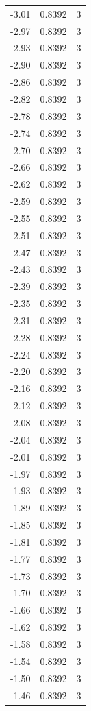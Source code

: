 \begin{longtable}{lrr}
  -3.01 & 0.8392 & 3 \\
  -2.97 & 0.8392 & 3 \\
  -2.93 & 0.8392 & 3 \\
  -2.90 & 0.8392 & 3 \\
  -2.86 & 0.8392 & 3 \\
  -2.82 & 0.8392 & 3 \\
  -2.78 & 0.8392 & 3 \\
  -2.74 & 0.8392 & 3 \\
  -2.70 & 0.8392 & 3 \\
  -2.66 & 0.8392 & 3 \\
  -2.62 & 0.8392 & 3 \\
  -2.59 & 0.8392 & 3 \\
  -2.55 & 0.8392 & 3 \\
  -2.51 & 0.8392 & 3 \\
  -2.47 & 0.8392 & 3 \\
  -2.43 & 0.8392 & 3 \\
  -2.39 & 0.8392 & 3 \\
  -2.35 & 0.8392 & 3 \\
  -2.31 & 0.8392 & 3 \\
  -2.28 & 0.8392 & 3 \\
  -2.24 & 0.8392 & 3 \\
  -2.20 & 0.8392 & 3 \\
  -2.16 & 0.8392 & 3 \\
  -2.12 & 0.8392 & 3 \\
  -2.08 & 0.8392 & 3 \\
  -2.04 & 0.8392 & 3 \\
  -2.01 & 0.8392 & 3 \\
  -1.97 & 0.8392 & 3 \\
  -1.93 & 0.8392 & 3 \\
  -1.89 & 0.8392 & 3 \\
  -1.85 & 0.8392 & 3 \\
  -1.81 & 0.8392 & 3 \\
  -1.77 & 0.8392 & 3 \\
  -1.73 & 0.8392 & 3 \\
  -1.70 & 0.8392 & 3 \\
  -1.66 & 0.8392 & 3 \\
  -1.62 & 0.8392 & 3 \\
  -1.58 & 0.8392 & 3 \\
  -1.54 & 0.8392 & 3 \\
  -1.50 & 0.8392 & 3 \\
  -1.46 & 0.8392 & 3 \\

\end{longtable}
